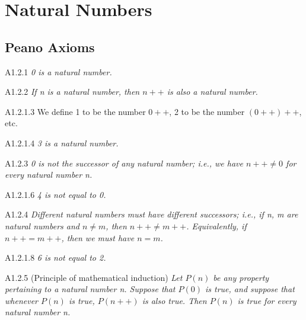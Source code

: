 \section{Natural Numbers}

\subsection{Peano Axioms}
\begin{axiom}{A1.2.1}
\emph{0 is a natural number.}
\end{axiom}

\begin{axiom}{A1.2.2}
\emph{If n is a natural number, then $n++$ is also a natural number.}
\end{axiom}

\begin{definition}{A1.2.1.3}
We define 1 to be the number $0++$, 2 to be the number $(0++)++$, etc.
\end{definition}

\begin{proposition}{A1.2.1.4}
\emph{3 is a natural number.}
\end{proposition}

\begin{axiom}{A1.2.3}
\emph{0 is not the successor of any natural number; i.e., we have $n++ \neq 0$ for every natural number n.}
\end{axiom}

\begin{proposition}{A1.2.1.6}
\emph{4 is not equal to 0.}
\end{proposition}

\begin{axiom}{A1.2.4}
\emph{Different natural numbers must have different successors; i.e., if n, m are natural numbers and $n\neq m$, then $n++\neq m++$. Equivalently, if $n++ = m++$, then we must have $n=m$.}
\end{axiom}

\begin{proposition}{A1.2.1.8}
\emph{6 is not equal to 2.}
\end{proposition}

\begin{axiom}{A1.2.5}
    (Principle of mathematical induction) \emph{Let $P(n)$ be any property pertaining to a natural number n. Suppose that $P(0)$ is true, and suppose that whenever $P(n)$ is true, $P(n++)$ is also true. Then $P(n)$ is true for every natural number n.}
\end{axiom}

